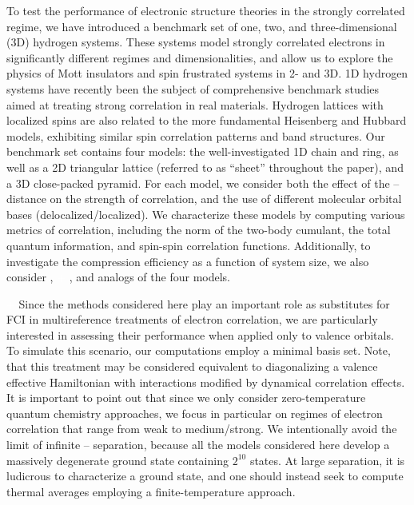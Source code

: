 \documentclass[aip,jcp,amsmath,amssymb, preprint]{revtex4-1}
\newcommand{\add}[1]{\colorbox{goodgreen}{\textcolor{white}{\footnotesize  \fontfamily{phv}\selectfont +}}
    \textcolor{goodgreen}{{#1}}\xspace}
\begin{document}
To test the performance of electronic structure theories in the strongly correlated regime, we have introduced a benchmark set of one, two, and three-dimensional (3D) hydrogen systems.
These systems model strongly correlated electrons in significantly different regimes and dimensionalities, and allow us to explore the physics of Mott insulators and spin frustrated systems in 2- and 3D.
1D hydrogen systems have recently been the subject of comprehensive benchmark studies aimed at treating strong correlation in real materials.\cite{Sinitskiy2010StrongCorrelation,Motta2017TowardsThe, motta2019ground}
Hydrogen lattices with localized spins are also related to the more fundamental Heisenberg and Hubbard models, exhibiting similar spin correlation patterns and band structures.
Our benchmark set contains four  models: the well-investigated 1D chain and ring, as well as a 2D triangular lattice (referred to as ``sheet'' throughout the paper), and a 3D close-packed pyramid.
For each model, we consider both the effect of the -- distance on the strength of correlation, and the use of different molecular orbital bases (delocalized/localized).
We characterize these models by computing various metrics of correlation, including the norm of the two-body cumulant, the total quantum information, and spin-spin correlation functions.
Additionally, to investigate the compression efficiency as a function of system size, we also consider ,  \add{, and } analogs of the four models.

\add{Since the methods considered here play an important role as substitutes for FCI in multireference treatments of electron correlation,\cite{Yanai:2010kf,Saitow:2013ij,Kurashige:2014bq,Guo:2016fu,Wouters:2016fb,schriber2018combined} we are particularly interested in assessing their performance when applied only to valence orbitals.
To simulate this scenario, our computations employ a minimal basis set.
Note, that this treatment may be considered equivalent to diagonalizing a valence effective Hamiltonian\cite{Freed:1974vo} with interactions modified by dynamical correlation effects.
}
It is important to point out that since we only consider zero-temperature quantum chemistry approaches, we focus in particular on regimes of electron correlation that range from weak to medium/strong.
We intentionally avoid the limit of infinite -- separation, because all the models considered here develop a massively degenerate ground state containing $2^{10}$ states.
At large separation, it is ludicrous to characterize a ground state, and one should instead seek to compute thermal averages employing a finite-temperature approach.\cite{welden2016exploring, white2018time, harsha2019thermofield}
\end{document}

